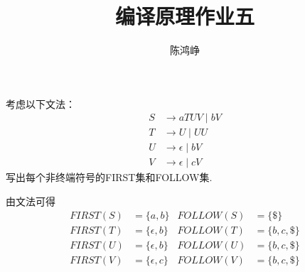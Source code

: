 \documentclass[logo,reportComp]{thesis}
\title{编译原理作业五}
\subtitle{}
\author{陈鸿峥}
\begin{document}
\maketitle

\begin{question}
考虑以下文法：
\[\begin{aligned}
S &\to aTUV \mid bV\\
T &\to U \mid UU\\
U &\to \epsilon \mid bV\\
V &\to \epsilon \mid cV
\end{aligned}\]
写出每个非终端符号的FIRST集和FOLLOW集.
\end{question}
\begin{answer}
由文法可得
\[\begin{array}{rlrl}
FIRST(S) &= \{a,b\} & FOLLOW(S) &= \{\$\}\\
FIRST(T) &= \{\epsilon,b\} & FOLLOW(T) &= \{b,c,\$\}\\
FIRST(U) &= \{\epsilon,b\} & FOLLOW(U) &= \{b,c,\$\}\\
FIRST(V) &= \{\epsilon,c\} & FOLLOW(V) &= \{b,c,\$\}\\
\end{array}\]
\end{answer}
\end{document}
